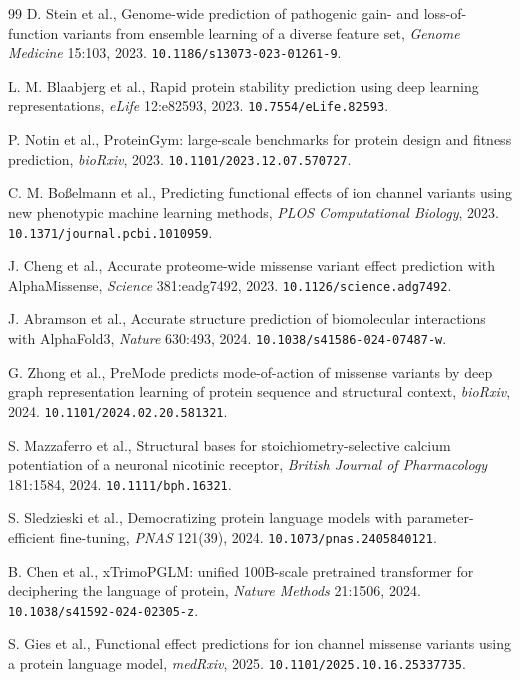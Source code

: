 \documentclass[11pt]{article}
\begin{document}
\begin{thebibliography}{99}
 D. Stein et al., Genome-wide prediction of pathogenic gain- and loss-of-function variants from ensemble learning of a diverse feature set, \emph{Genome Medicine} 15:103, 2023. \texttt{10.1186/s13073-023-01261-9}.

 L. M. Blaabjerg et al., Rapid protein stability prediction using deep learning representations, \emph{eLife} 12:e82593, 2023. \texttt{10.7554/eLife.82593}.

 P. Notin et al., ProteinGym: large-scale benchmarks for protein design and fitness prediction, \emph{bioRxiv}, 2023. \texttt{10.1101/2023.12.07.570727}.

 C. M. Bo{\ss}elmann et al., Predicting functional effects of ion channel variants using new phenotypic machine learning methods, \emph{PLOS Computational Biology}, 2023. \texttt{10.1371/journal.pcbi.1010959}.

 J. Cheng et al., Accurate proteome-wide missense variant effect prediction with AlphaMissense, \emph{Science} 381:eadg7492, 2023. \texttt{10.1126/science.adg7492}.

 J. Abramson et al., Accurate structure prediction of biomolecular interactions with AlphaFold3, \emph{Nature} 630:493, 2024. \texttt{10.1038/s41586-024-07487-w}.

 G. Zhong et al., PreMode predicts mode-of-action of missense variants by deep graph representation learning of protein sequence and structural context, \emph{bioRxiv}, 2024. \texttt{10.1101/2024.02.20.581321}.

 S. Mazzaferro et al., Structural bases for stoichiometry-selective calcium potentiation of a neuronal nicotinic receptor, \emph{British Journal of Pharmacology} 181:1584, 2024. \texttt{10.1111/bph.16321}.

 S. Sledzieski et al., Democratizing protein language models with parameter-efficient fine-tuning, \emph{PNAS} 121(39), 2024. \texttt{10.1073/pnas.2405840121}.

 B. Chen et al., xTrimoPGLM: unified 100B-scale pretrained transformer for deciphering the language of protein, \emph{Nature Methods} 21:1506, 2024. \texttt{10.1038/s41592-024-02305-z}.

 S. Gies et al., Functional effect predictions for ion channel missense variants using a protein language model, \emph{medRxiv}, 2025. \texttt{10.1101/2025.10.16.25337735}.

\end{thebibliography}
\end{document}
